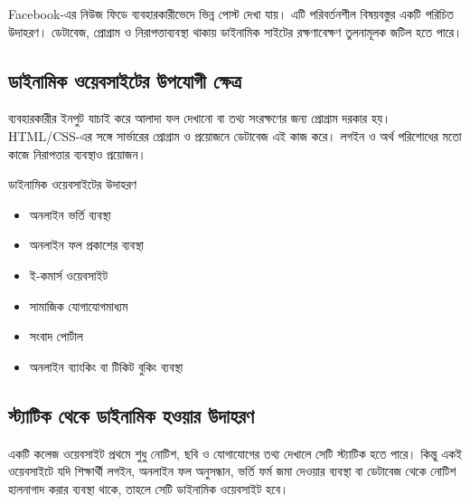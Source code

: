 Facebook-এর নিউজ ফিডে ব্যবহারকারীভেদে ভিন্ন পোস্ট দেখা যায়। এটি পরিবর্তনশীল বিষয়বস্তুর একটি পরিচিত উদাহরণ। ডেটাবেজ, প্রোগ্রাম ও নিরাপত্তাব্যবস্থা থাকায় ডাইনামিক সাইটের রক্ষণাবেক্ষণ তুলনামূলক জটিল হতে পারে।

\subsection{ডাইনামিক ওয়েবসাইটের উপযোগী ক্ষেত্র}

ব্যবহারকারীর ইনপুট যাচাই করে আলাদা ফল দেখানো বা তথ্য সংরক্ষণের জন্য প্রোগ্রাম দরকার হয়। HTML/CSS-এর সঙ্গে সার্ভারের প্রোগ্রাম ও প্রয়োজনে ডেটাবেজ এই কাজ করে। লগইন ও অর্থ পরিশোধের মতো কাজে নিরাপত্তার ব্যবস্থাও প্রয়োজন।

\begin{examplebox}{ডাইনামিক ওয়েবসাইটের উদাহরণ}
\par\noindent
\begin{minipage}[t]{.48\linewidth}\vspace{0pt}
\begin{itemize}
\item অনলাইন ভর্তি ব্যবস্থা
\item অনলাইন ফল প্রকাশের ব্যবস্থা
\item ই-কমার্স ওয়েবসাইট
\end{itemize}
\end{minipage}\hfill
\begin{minipage}[t]{.48\linewidth}\vspace{0pt}
\begin{itemize}
\item সামাজিক যোগাযোগমাধ্যম
\item সংবাদ পোর্টাল
\item অনলাইন ব্যাংকিং বা টিকিট বুকিং ব্যবস্থা
\end{itemize}
\end{minipage}\par

\end{examplebox}

\subsection{স্ট্যাটিক থেকে ডাইনামিক হওয়ার উদাহরণ}

একটি কলেজ ওয়েবসাইট প্রথমে শুধু নোটিশ, ছবি ও যোগাযোগের তথ্য দেখালে সেটি স্ট্যাটিক হতে পারে। কিন্তু একই ওয়েবসাইটে যদি শিক্ষার্থী লগইন, অনলাইন ফল অনুসন্ধান, ভর্তি ফর্ম জমা দেওয়ার ব্যবস্থা বা ডেটাবেজ থেকে নোটিশ হালনাগাদ করার ব্যবস্থা থাকে, তাহলে সেটি ডাইনামিক ওয়েবসাইট হবে।

